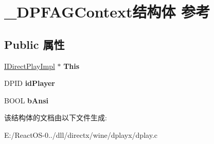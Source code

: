 \hypertarget{struct___d_p_f_a_g_context}{}\section{\+\_\+\+D\+P\+F\+A\+G\+Context结构体 参考}
\label{struct___d_p_f_a_g_context}
\subsection*{Public 属性}
\begin{DoxyCompactItemize}
\item 
\mbox{\label{struct___d_p_f_a_g_context_a94ae33667519a888005808cd33d19323}} 
\hyperlink{struct_i_direct_play_impl}{I\+Direct\+Play\+Impl} $\ast$ {\bfseries This}
\item 
\mbox{\label{struct___d_p_f_a_g_context_a1424d3a91b8e6de40b40e08ca573a5bb}} 
D\+P\+ID {\bfseries id\+Player}
\item 
\mbox{\label{struct___d_p_f_a_g_context_aeb8f9d2693ea8dcd4d064e80feb24ee4}} 
B\+O\+OL {\bfseries b\+Ansi}
\end{DoxyCompactItemize}


该结构体的文档由以下文件生成\+:\begin{DoxyCompactItemize}
\item 
E\+:/\+React\+O\+S-\/0../dll/directx/wine/dplayx/dplay.\+c\end{DoxyCompactItemize}

